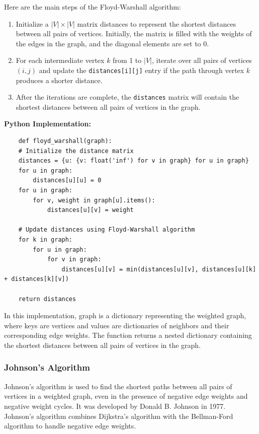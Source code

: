 \documentclass[12pt]{book} %
\begin{document}
Here are the main steps of the Floyd-Warshall algorithm:

\begin{enumerate}
    \item Initialize a $|V| \times |V|$ matrix distances to represent the shortest distances between all pairs of vertices. Initially, the matrix is filled with the weights of the edges in the graph, and the diagonal elements are set to 0.
    \item For each intermediate vertex $k$ from 1 to $|V|$, iterate over all pairs of vertices $(i, j)$ and update the \texttt{distances[i][j]} entry if the path through vertex $k$ produces a shorter distance.
    \item After the iterations are complete, the \texttt{distances} matrix will contain the shortest distances between all pairs of vertices in the graph.
\end{enumerate}

\textbf{Python Implementation:}
\FloatBarrier
\begin{lstlisting}
    def floyd_warshall(graph):
    # Initialize the distance matrix
    distances = {u: {v: float('inf') for v in graph} for u in graph}
    for u in graph:
        distances[u][u] = 0
    for u in graph:
        for v, weight in graph[u].items():
            distances[u][v] = weight
    
    # Update distances using Floyd-Warshall algorithm
    for k in graph:
        for u in graph:
            for v in graph:
                distances[u][v] = min(distances[u][v], distances[u][k] + distances[k][v])
    
    return distances
\end{lstlisting}
In this implementation, graph is a dictionary representing the weighted graph, where keys are vertices and values are dictionaries of neighbors and their corresponding edge weights. The function returns a nested dictionary containing the shortest distances between all pairs of vertices in the graph.

\subsubsection{Johnson's Algorithm}
Johnson's algorithm is used to find the shortest paths between all pairs of vertices in a weighted graph, even in the presence of negative edge weights and negative weight cycles. It was developed by Donald B. Johnson in 1977. Johnson's algorithm combines Dijkstra's algorithm with the Bellman-Ford algorithm to handle negative edge weights.
\end{document}
